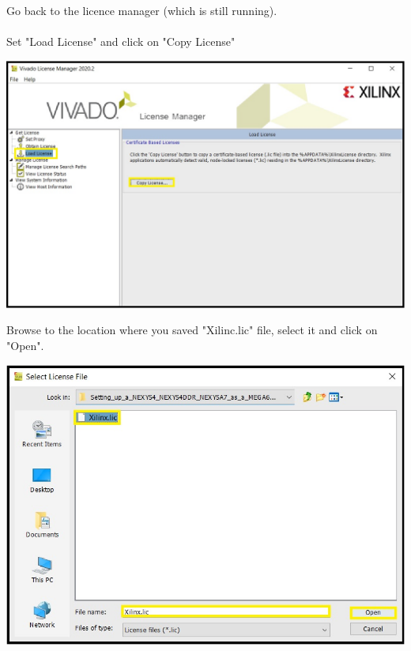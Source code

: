 \begin{minipage}{\linewidth}
  Go back to the licence manager (which is still running). \\
  \\
  Set "Load License" and click on "Copy License"
  \\
  \begin{center}
    \includegraphics[width=0.8\linewidth]{images/VivadoInstimg030.jpg}
  \end{center}
\end{minipage}

\begin{minipage}{\linewidth}
  Browse to the location where you saved "Xilinc.lic" file, select it and click on "Open".
  \\
  \begin{center}
    \includegraphics[width=0.7\linewidth]{images/VivadoInstimg031.jpg}
  \end{center}
\end{minipage}

